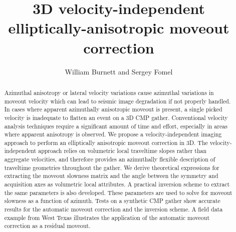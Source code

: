 \title{3D velocity-independent elliptically-anisotropic moveout correction}


\author{William Burnett and Sergey Fomel}


\address{Bureau of Economic Geology \\
John A. and Katherine G. Jackson School of Geosciences \\
The University of Texas at Austin \\
University Station, Box X \\
Austin, TX 78713-8924}


\maketitle

\begin{abstract}

Azimuthal anisotropy or lateral velocity variations cause azimuthal
variations in moveout velocity which can lead to seismic image
degradation if not properly handled.  In cases where apparent
azimuthally anisotropic moveout is present, a single picked velocity
is inadequate to flatten an event on a 3D CMP gather.  Conventional
velocity analysis techniques require a significant amount of time and
effort, especially in areas where apparent anisotropy is observed.  We
propose a velocity-independent imaging approach to perform an
elliptically anisotropic moveout correction in 3D.  The
velocity-independent approach relies on volumetric local traveltime
slopes rather than aggregate velocities, and therefore provides an
azimuthally flexible description of traveltime geometries throughout
the gather.  We derive theoretical expressions for extracting the
moveout slowness matrix and the angle between the symmetry and
acquisition axes as volumetric local attributes.  A practical
inversion scheme to extract the same parameters is also developed.
These parameters are used to solve for moveout slowness as a function
of azimuth.  Tests on a synthetic CMP gather show accurate results for
the automatic moveout correction and the inversion scheme.  A field
data example from West Texas illustrates the application of the
automatic moveout correction as a residual moveout.

\end{abstract}

